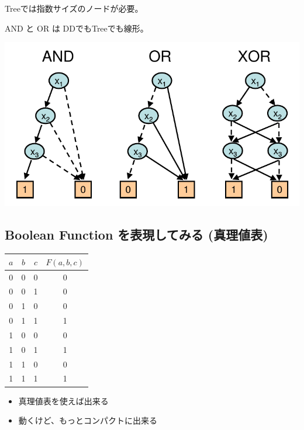 Treeでは指数サイズのノードが必要。

AND と OR は DDでもTreeでも線形。

\includegraphics{img/static/dd-xor.png}

\subsection{Boolean Function を表現してみる (真理値表)}
\label{sec-4-2}

\begin{container-fluid}
\begin{row-fluid}
\begin{span6}
\begin{center}
\begin{tabular}{|ccc|c|}
$a$ & $b$ & $c$ & $F(a,b,c)$\\
\hline
0 & 0 & 0 & 0\\
0 & 0 & 1 & 0\\
0 & 1 & 0 & 0\\
0 & 1 & 1 & 1\\
1 & 0 & 0 & 0\\
1 & 0 & 1 & 1\\
1 & 1 & 0 & 0\\
1 & 1 & 1 & 1\\
\end{tabular}
\end{center}
\end{span6}
\begin{span6}
\begin{itemize}
\item 真理値表を使えば出来る
\item 動くけど、もっとコンパクトに出来る
\end{itemize}
\end{span6}
\end{row-fluid}
\end{container-fluid}

